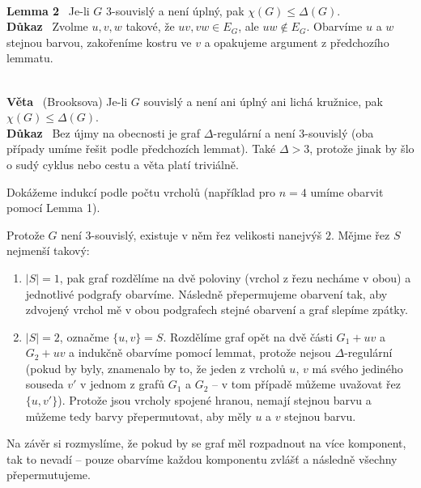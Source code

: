 \documentclass{article}
\renewcommand{\paragraph}[1]{\ \\\smallskip\noindent\textbf{#1}\ }
\begin{document}
\paragraph{Lemma 2}
Je-li $G$ 3-souvislý a není úplný, pak $\chi(G) \leq \Delta(G)$.
\paragraph{Důkaz}
Zvolme $u,v,w$ takové, že $uv, vw\in E_G$, ale $uw \notin E_G$. Obarvíme $u$ a 
$w$ stejnou barvou, zakořeníme kostru ve $v$ a opakujeme argument z předchozího 
lemmatu.

\paragraph{Věta} (Brooksova) Je-li $G$ souvislý a není ani úplný ani lichá 
kružnice, pak $\chi(G) \leq \Delta(G)$.
\paragraph{Důkaz} Bez újmy na obecnosti je graf $\Delta$-regulární a není 
3-souvislý (oba případy umíme řešit podle předchozích lemmat). Také $\Delta > 
3$, protože jinak by šlo o sudý cyklus nebo cestu a věta platí triviálně.

Dokážeme indukcí podle počtu vrcholů (například pro $n=4$ umíme obarvit pomocí 
Lemma 1).

Protože $G$ není 3-souvislý, existuje v něm řez velikosti nanejvýš $2$. Mějme 
řez $S$ nejmenší takový:
\begin{enumerate}
	\item $|S| = 1$, pak graf rozdělíme na dvě poloviny (vrchol z řezu necháme v 
	obou) a jednotlivé podgrafy obarvíme. Následně přepermujeme obarvení tak, 
	aby zdvojený vrchol mě v obou podgrafech stejné obarvení a graf slepíme 
	zpátky.
	\item $|S| = 2$, označme $\{u,v\} = S$. Rozdělíme graf opět na dvě části 
	$G_1 + uv$ a $G_2 + uv$ a indukčně obarvíme pomocí lemmat, protože nejsou 
	$\Delta$-regulární (pokud by byly, znamenalo by to, že jeden z vrcholů $u$, 
	$v$ má svého jediného souseda $v'$ v jednom z grafů $G_1$ a $G_2$ -- v tom 
	případě můžeme uvažovat řez $\{u,v'\}$).  Protože jsou vrcholy spojené 
	hranou, nemají stejnou barvu a můžeme tedy barvy přepermutovat, aby měly $u$ 
	a $v$ stejnou barvu.
\end{enumerate}
Na závěr si rozmyslíme, že pokud by se graf měl rozpadnout na více komponent, 
tak to nevadí -- pouze obarvíme každou komponentu zvlášť a následně všechny 
přepermutujeme.
\end{document}
